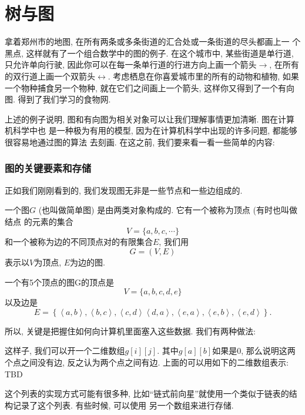 \part{树与图}

拿着郑州市的地图, 在所有两条或多条街道的汇合处或一条街道的尽头都画上一
个黑点, 这样就有了一个组合数学中的图的例子. 在这个城市中, 某些街道是单行道, 
只允许单向行驶, 因此你可以在每一条单行道的行进方向上画一个箭头$\rightarrow$, 
在所有的双行道上画一个双箭头$\leftrightarrow$. 
考虑栖息在你喜爱城市里的所有的动物和植物, 如果一个物种捕食另一个物种, 
就在它们之间画上一个箭头, 这样你又得到了一个有向图. 得到了我们学习的食物网. 

上述的例子说明, 图和有向图为相关对象可以让我们理解事情更加清晰. 图在计算机科学中也
是一种极为有用的模型, 因为在计算机科学中出现的许多问题, 都能够很容易地通过图的算法
去刻画. 在这之前, 我们要来看一看一些简单的内容: 

\section{图的关键要素和存储}

正如我们刚刚看到的, 我们发现图无非是一些节点和一些边组成的. 

\begin{definition}
一个图$G$ (也叫做简单图) 是由两类对象构成的. 它有一个被称为顶点 (有时也叫做结点
的元素的集合
$$
V=\{a,b,c,\cdots\}
$$
和一个被称为边的不同顶点对的有限集合$E$, 我们用
$$
G=(V,E)
$$
表示以$V$为顶点, $E$为边的图. 
\end{definition}

\begin{example}
一个有5个顶点的图G的顶点是
$$
V=\{a,b,c,d,e\}
$$
以及边是
$$
E=\left\{\left\langle a,b\right\rangle,\left\langle b,c\right\rangle,\left\langle c,d\right\rangle\left\langle d,a\right\rangle,\left\langle e,a\right\rangle,\left\langle e,b\right\rangle,\left\langle e,d\right\rangle\right\}.
$$
\end{example}

所以, 关键是把握住如何向计算机里面塞入这些数据. 我们有两种做法: 

 这样子, 我们可以开一个二维数组$g[i][j]$. 
其中$g[a][b]$如果是0, 那么说明这两个点之间没有边, 反之认为两个点之间有边. 
上面的可以用如下的二维数组表示: TBD 

 这个列表的实现方式可能有很多种, 
比如``链式前向星''就使用一个类似于链表的结构记录了这个列表. 有些时候, 可以使用
另一个数组来进行存储. 

